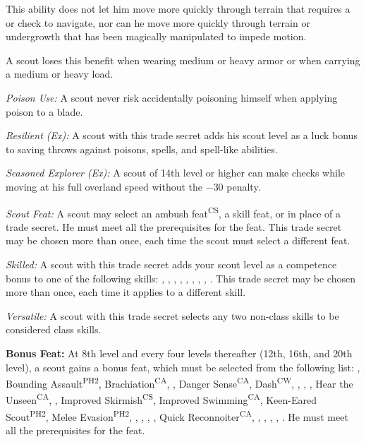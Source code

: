 This ability does not let him move more quickly through terrain that requires a  or  check to navigate, nor can he move more quickly through terrain or undergrowth that has been magically manipulated to impede motion.

A scout loses this benefit when wearing medium or heavy armor or when carrying a medium or heavy load.

\textit{Poison Use:} A scout never risk accidentally poisoning himself when applying poison to a blade.

\textit{Resilient (Ex):} A scout with this trade secret adds \onehalf his scout level as a luck bonus to saving throws against poisons, spells, and spell-like abilities.

\textit{Seasoned Explorer (Ex):} A scout of 14th level or higher can make  checks while moving at his full overland speed without the $-30$ penalty.

\textit{Scout Feat:} A scout may select an ambush feat\textsuperscript{CS}, a skill feat, or  in place of a trade secret. He must meet all the prerequisites for the feat. This trade secret may be chosen more than once, each time the scout must select a different feat.

\textit{Skilled:} A scout with this trade secret adds \onequarter your scout level as a competence bonus to one of the following skills: , , , , , , , , . This trade secret may be chosen more than once, each time it applies to a different skill.

\textit{Versatile:} A scout with this trade secret selects any two non-class skills to be considered class skills.


\textbf{Bonus Feat:} At 8th level and every four levels thereafter (12th, 16th, and 20th level), a scout gains a bonus feat, which must be selected from the following list:
,
Bounding Assault\textsuperscript{PH2},
Brachiation\textsuperscript{CA},
,
Danger Sense\textsuperscript{CA},
Dash\textsuperscript{CW},
,
,
,
Hear the Unseen\textsuperscript{CA},
,
Improved Skirmish\textsuperscript{CS},
Improved Swimming\textsuperscript{CA},
Keen-Eared Scout\textsuperscript{PH2},
Melee Evasion\textsuperscript{PH2},
,
,
,
,
Quick Reconnoiter\textsuperscript{CA},
,
,
,
,
.
He must meet all the prerequisites for the feat.


